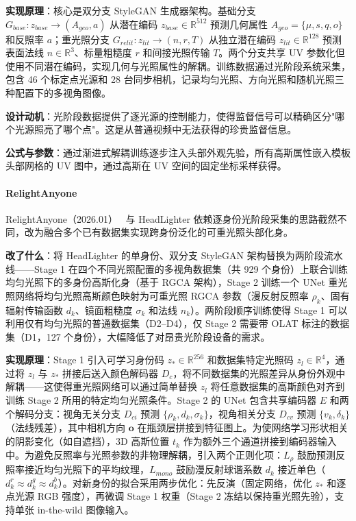 \textbf{实现原理}：核心是双分支 StyleGAN 生成器架构。基础分支 $G_{base}: z_{base} \to (A_{geo}, a)$ 从潜在编码 $z_{base} \in \mathbb{R}^{512}$ 预测几何属性 $A_{geo} = \{\mu, s, q, o\}$ 和反照率 $a$；重光照分支 $G_{relit}: z_{lit} \to (n, r, T)$ 从独立潜在编码 $z_{lit} \in \mathbb{R}^{128}$ 预测表面法线 $n \in \mathbb{R}^3$、标量粗糙度 $r$ 和间接光照传输 $T$。两个分支共享 UV 参数化但使用不同潜在编码，实现几何与光照属性的解耦。训练数据通过光阶段系统采集，包含 46 个标定点光源和 28 台同步相机，记录均匀光照、方向光照和随机光照三种配置下的多视角图像。

\textbf{设计动机}：光阶段数据提供了逐光源的控制能力，使得监督信号可以精确区分"哪个光源照亮了哪个点"。这是从普通视频中无法获得的珍贵监督信息。

\textbf{公式与参数}：通过渐进式解耦训练逐步注入头部外观先验，所有高斯属性嵌入模板头部网格的 UV 图中，通过高斯在 UV 空间的固定坐标采样获得。

\paragraph{RelightAnyone}

RelightAnyone（2026.01）~\cite{2601_03357} 与 HeadLighter 依赖逐身份光阶段采集的思路截然不同，改为融合多个已有数据集实现跨身份泛化的可重光照头部化身。

\textbf{改了什么}：将 HeadLighter 的单身份、双分支 StyleGAN 架构替换为两阶段流水线——Stage 1 在四个不同光照配置的多视角数据集（共 929 个身份）上联合训练均匀光照下的多身份高斯化身（基于 RGCA 架构），Stage 2 训练一个 UNet 重光照网络将均匀光照高斯颜色映射为可重光照 RGCA 参数（漫反射反照率 $\rho_k$、固有辐射传输函数 $d_k$、镜面粗糙度 $\sigma_k$ 和法线 $n_k$）。两阶段顺序训练使得 Stage 1 可以利用仅有均匀光照的普通数据集（D2--D4），仅 Stage 2 需要带 OLAT 标注的数据集（D1，127 个身份），大幅降低了对昂贵光阶段设备的需求。

\textbf{实现原理}：Stage 1 引入可学习身份码 $z_* \in \mathbb{R}^{256}$ 和数据集特定光照码 $z_l \in \mathbb{R}^{4}$，通过将 $z_l$ 与 $z_*$ 拼接后送入颜色解码器 $D_c$，将不同数据集的光照差异从身份外观中解耦——这使得重光照网络可以通过简单替换 $z_l$ 将任意数据集的高斯颜色对齐到训练 Stage 2 所用的特定均匀光照条件。Stage 2 的 UNet 包含共享编码器 $E$ 和两个解码分支：视角无关分支 $D_{ci}$ 预测 $\{\rho_k, d_k, \sigma_k\}$，视角相关分支 $D_{cv}$ 预测 $\{v_k, \delta_k\}$（法线残差），其中相机方向 $\mathbf{o}$ 在瓶颈层拼接到特征图上。为使网络学习形状相关的阴影变化（如自遮挡），3D 高斯位置 $t_k$ 作为额外三个通道拼接到编码器输入中。为避免反照率与光照参数的非物理解耦，引入两个正则化项：$L_\rho$ 鼓励预测反照率接近均匀光照下的平均纹理，$L_{mono}$ 鼓励漫反射球谐系数 $d_k$ 接近单色（$d_k^r \approx d_k^g \approx d_k^b$）。对新身份的拟合采用两步优化：先反演（固定网络，优化 $z_*$ 和逐点光源 RGB 强度），再微调 Stage 1 权重（Stage 2 冻结以保持重光照先验），支持单张 in-the-wild 图像输入。

